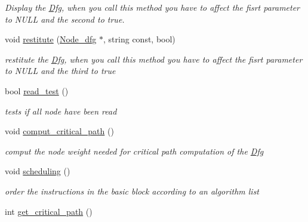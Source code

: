 \begin{DoxyCompactItemize}
\begin{DoxyCompactList}\small\item\em \-Display the \hyperlink{classDfg}{\-Dfg}, when you call this method you have to affect the fisrt parameter to \-N\-U\-L\-L and the second to true. \end{DoxyCompactList}\item 
\hypertarget{classDfg_a2598772fa5761e77dcb975048775602b}{void \hyperlink{classDfg_a2598772fa5761e77dcb975048775602b}{restitute} (\hyperlink{classNode__dfg}{\-Node\-\_\-dfg} $\ast$, string const, bool)}\label{classDfg_a2598772fa5761e77dcb975048775602b}

\begin{DoxyCompactList}\small\item\em restitute the \hyperlink{classDfg}{\-Dfg}, when you call this method you have to affect the fisrt parameter to \-N\-U\-L\-L and the third to true \end{DoxyCompactList}\item 
\hypertarget{classDfg_a1a6dc2d38709c345177eec0d37ec43e2}{bool \hyperlink{classDfg_a1a6dc2d38709c345177eec0d37ec43e2}{read\-\_\-test} ()}\label{classDfg_a1a6dc2d38709c345177eec0d37ec43e2}

\begin{DoxyCompactList}\small\item\em tests if all node have been read \end{DoxyCompactList}\item 
\hypertarget{classDfg_af2212e74538c7e41980e8290b1981072}{void \hyperlink{classDfg_af2212e74538c7e41980e8290b1981072}{comput\-\_\-critical\-\_\-path} ()}\label{classDfg_af2212e74538c7e41980e8290b1981072}

\begin{DoxyCompactList}\small\item\em comput the node weight needed for critical path computation of the \hyperlink{classDfg}{\-Dfg} \end{DoxyCompactList}\item 
\hypertarget{classDfg_a9ae0a88ce5e401ff57c03f3c0aefbb2c}{void \hyperlink{classDfg_a9ae0a88ce5e401ff57c03f3c0aefbb2c}{scheduling} ()}\label{classDfg_a9ae0a88ce5e401ff57c03f3c0aefbb2c}

\begin{DoxyCompactList}\small\item\em order the instructions in the basic block according to an algorithm list \end{DoxyCompactList}\item 
\hypertarget{classDfg_a568f4d0d48fc38f8fcdc4944b8d48740}{int \hyperlink{classDfg_a568f4d0d48fc38f8fcdc4944b8d48740}{get\-\_\-critical\-\_\-path} ()}\label{classDfg_a568f4d0d48fc38f8fcdc4944b8d48740}


\end{DoxyCompactItemize}
